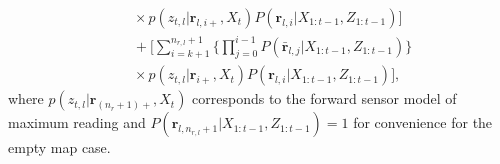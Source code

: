 \documentclass[letterpaper, 10pt, conference]{ieeeconf}
\begin{document}
\begin{appendix}
\begin{align}
&\quad\times p(z_{t,l}|\mathbf{r}_{l,i+},X_t)P(\mathbf{r}_{l,i}|X_{1:t-1},Z_{1:t-1})\bigg]
\nonumber
\\
&\quad
+
\bigg[\sum_{i=k+1}^{n_{r,l}+1}\bigg\{\prod_{j=0}^{i-1}P(\bar{\mathbf{r}}_{l,j}|X_{1:t-1},Z_{1:t-1})\bigg\}\nonumber\\
&\quad\times p(z_{t,l}|\mathbf{r}_{i+},X_t)P(\mathbf{r}_{l,i}|X_{1:t-1},Z_{1:t-1})\bigg],\label{eqn:tildePbar}
\end{align}
where $p(z_{t,l}|\mathbf{r}_{(n_r+1)+},X_t)$ corresponds to the forward sensor model of maximum reading and $P(\mathbf{r}_{l,n_{r,l}+1}|X_{1:t-1},Z_{1:t-1})=1$ for convenience for the empty map case.



\end{appendix}
\end{document}
